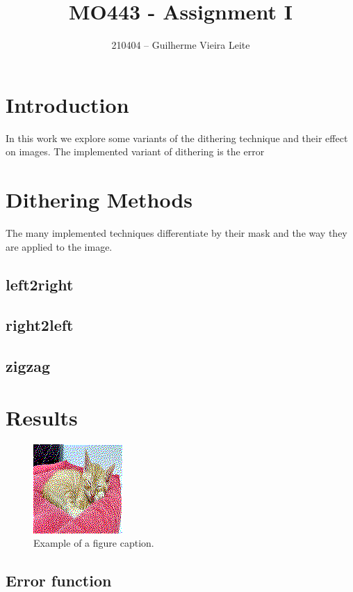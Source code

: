 \documentclass[conference]{IEEEtran}
\begin{document}
\title{MO443 - Assignment I}

\author{210404 -- Guilherme Vieira Leite}

\maketitle

\section{Introduction}

In this work we explore some variants of the dithering technique and their effect on images. The implemented variant of dithering is the error

\section{Dithering Methods}

The many implemented techniques differentiate by their mask and the way they are applied to the image.

\subsection{left2right}
\subsection{right2left}
\subsection{zigzag}

\section{Results}

\begin{figure}[htbp]
\centerline{\includegraphics{figures/left2right/flo_color_juquinha.png}}
\caption{Example of a figure caption.}
\label{fig}
\end{figure}

\subsection{Error function}
\end{document}
